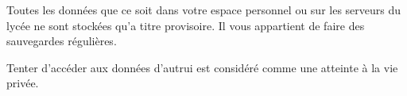 \documentclass[10pt,fleqn]{article} %
\begin{document}

\begin{warn}
Toutes les données que ce soit dans votre espace personnel ou sur les serveurs du lycée ne sont stockées qu'a titre provisoire. Il vous appartient de faire des sauvegardes régulières.
\end{warn}


\begin{warn}
Tenter d'accéder aux données d'autrui est considéré comme une atteinte à la vie privée.
\end{warn}

\end{document}

